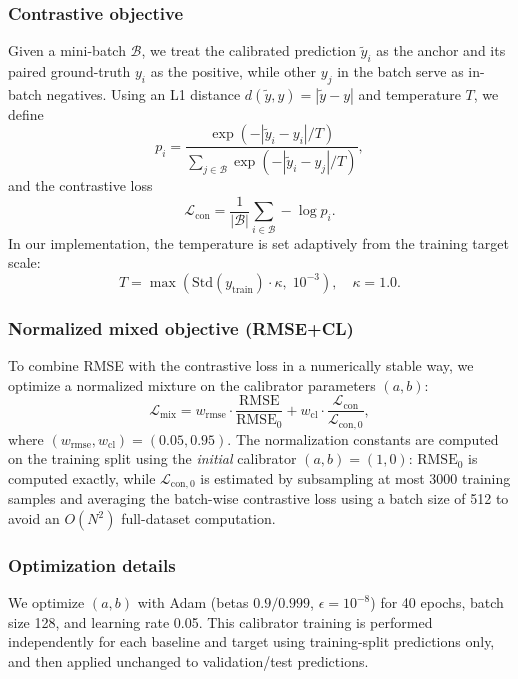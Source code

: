 \documentclass[pdflatex,sn-basic,Numbered]{sn-jnl}
\begin{document}
\subsubsection{Contrastive objective}
Given a mini-batch $\mathcal{B}$, we treat the calibrated prediction $\tilde{y}_i$ as the anchor and its paired ground-truth $y_i$ as the positive, while other $y_j$ in the batch serve as in-batch negatives. Using an L1 distance $d(\tilde{y},y)=|\tilde{y}-y|$ and temperature $T$, we define
\begin{equation}
p_i=
\frac{\exp\!\left(-|\tilde{y}_i-y_i|/T\right)}
{\sum_{j\in\mathcal{B}}\exp\!\left(-|\tilde{y}_i-y_j|/T\right)},
\end{equation}
and the contrastive loss
\begin{equation}
\mathcal{L}_{\mathrm{con}}=\frac{1}{|\mathcal{B}|}\sum_{i\in\mathcal{B}}-\log p_i.
\end{equation}
In our implementation, the temperature is set adaptively from the training target scale:
\begin{equation}
T=\max\!\left(\mathrm{Std}(y_{\mathrm{train}})\cdot \kappa,\;10^{-3}\right),\quad \kappa=1.0.
\end{equation}

\subsubsection{Normalized mixed objective (RMSE+CL)}
To combine RMSE with the contrastive loss in a numerically stable way, we optimize a normalized mixture on the calibrator parameters $(a,b)$:
\begin{equation}
\mathcal{L}_{\mathrm{mix}}
= w_{\mathrm{rmse}} \cdot \frac{\mathrm{RMSE}}{\mathrm{RMSE}_0}
+ w_{\mathrm{cl}}\cdot \frac{\mathcal{L}_{\mathrm{con}}}{\mathcal{L}_{\mathrm{con},0}},
\end{equation}
where $(w_{\mathrm{rmse}},w_{\mathrm{cl}})=(0.05,0.95)$. The normalization constants are computed on the training split using the \emph{initial} calibrator $(a,b)=(1,0)$: $\mathrm{RMSE}_0$ is computed exactly, while $\mathcal{L}_{\mathrm{con},0}$ is estimated by subsampling at most 3000 training samples and averaging the batch-wise contrastive loss using a batch size of 512 to avoid an $O(N^2)$ full-dataset computation.

\subsubsection{Optimization details}
We optimize $(a,b)$ with Adam (betas $0.9/0.999$, $\epsilon=10^{-8}$) for 40 epochs, batch size 128, and learning rate 0.05. This calibrator training is performed independently for each baseline and target using training-split predictions only, and then applied unchanged to validation/test predictions.
\end{document}
